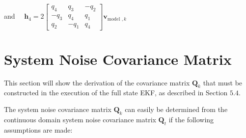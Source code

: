 and $\quad \mathbf{h}_{4}=2\left[\begin{array}{ccc}q_{4} & q_{3} & -q_{2} \\ -q_{3} & q_{4} & q_{1} \\ q_{2} & -q_{1} & q_{4}\end{array}\right] \mathbf{v}_{\text {model }, k}$

\chapter{System Noise Covariance Matrix}
\makeatletter{}\makeatother
\label{chap:System Noise Covariance Matrix}
This section will show the derivation of the covariance matrix $\mathbf{Q}_{k}$ that must be constructed in the execution of the full state EKF, as described in Section $5.4 .$

The system noise covariance matrix $\mathbf{Q}_{k}$ can easily be determined from the continuous domain system noise covariance matrix $\mathbf{Q}_{t}$ if the following assumptions are made:

